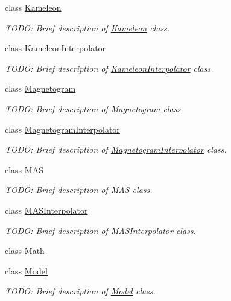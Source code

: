 \begin{DoxyCompactItemize}
class \hyperlink{classccmc_1_1_kameleon}{Kameleon}
\begin{DoxyCompactList}\small\item\em T\-O\-D\-O\-: Brief description of \hyperlink{classccmc_1_1_kameleon}{Kameleon} class. \end{DoxyCompactList}\item 
class \hyperlink{classccmc_1_1_kameleon_interpolator}{Kameleon\-Interpolator}
\begin{DoxyCompactList}\small\item\em T\-O\-D\-O\-: Brief description of \hyperlink{classccmc_1_1_kameleon_interpolator}{Kameleon\-Interpolator} class. \end{DoxyCompactList}\item 
class \hyperlink{classccmc_1_1_magnetogram}{Magnetogram}
\begin{DoxyCompactList}\small\item\em T\-O\-D\-O\-: Brief description of \hyperlink{classccmc_1_1_magnetogram}{Magnetogram} class. \end{DoxyCompactList}\item 
class \hyperlink{classccmc_1_1_magnetogram_interpolator}{Magnetogram\-Interpolator}
\begin{DoxyCompactList}\small\item\em T\-O\-D\-O\-: Brief description of \hyperlink{classccmc_1_1_magnetogram_interpolator}{Magnetogram\-Interpolator} class. \end{DoxyCompactList}\item 
class \hyperlink{classccmc_1_1_m_a_s}{M\-A\-S}
\begin{DoxyCompactList}\small\item\em T\-O\-D\-O\-: Brief description of \hyperlink{classccmc_1_1_m_a_s}{M\-A\-S} class. \end{DoxyCompactList}\item 
class \hyperlink{classccmc_1_1_m_a_s_interpolator}{M\-A\-S\-Interpolator}
\begin{DoxyCompactList}\small\item\em T\-O\-D\-O\-: Brief description of \hyperlink{classccmc_1_1_m_a_s_interpolator}{M\-A\-S\-Interpolator} class. \end{DoxyCompactList}\item 
class \hyperlink{classccmc_1_1_math}{Math}
\item 
class \hyperlink{classccmc_1_1_model}{Model}
\begin{DoxyCompactList}\small\item\em T\-O\-D\-O\-: Brief description of \hyperlink{classccmc_1_1_model}{Model} class. \end{DoxyCompactList}\item 

\end{DoxyCompactItemize}
